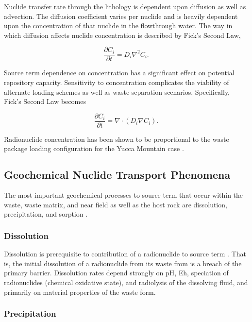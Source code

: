 {Nuclide transfer rate through the lithology is  dependent upon diffusion as
well as advection.  The diffusion coefficient varies per nuclide and is heavily
dependent upon the concentration of that nuclide in the flowthrough water.
The way in which diffusion affects nuclide concentration is described by Fick's 
Second Law, 

\begin{equation} 
  \frac{\partial C_i}{\partial t}  = D_i\nabla^2 C_i.  
\end{equation}

Source term dependence on concentration has a significant effect on potential
repository capacity. Sensitivity to concentration complicates the viability of
alternate loading schemes as well as waste separation scenarios. Specifically, 
Fick's Second Law becomes 

\begin{equation} 
  \frac{\partial C_i}{\partial t}  = \nabla \cdot ( D_i \nabla C_i ). 
\end{equation}

Radionuclide concentration has been shown to be proportional to the waste package
loading configuration for the Yucca Mountain case
\cite{ahn_relationship_2002,kawasaki_congruent_2004}.


\subsection{Geochemical Nuclide Transport Phenomena}

The most important geochemical processes to source term that occur within the
waste, waste matrix, and near field as well as the host rock are dissolution,
precipitation, and sorption \cite{bracke_safety_2008}. 

\subsubsection{Dissolution}

Dissolution is prerequisite to contribution of a radionuclide to source term 
\cite{bracke_safety_2008}. That is, the initial 
dissolution of a radionuclide from its waste from is a breach of the primary
barrier. Dissolution rates depend strongly on pH, Eh,
speciation of radionuclides (chemical oxidative state), and radiolysis of the
dissolving fluid, and primarily on material properties of the waste form.


\subsubsection{Precipitation}

}
